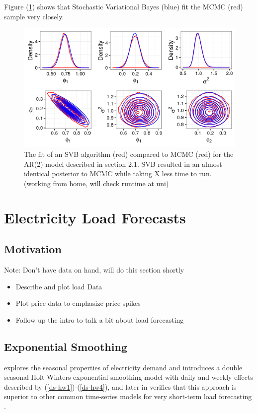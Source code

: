 \documentclass[12pt,a4paper]{article}%
\numberwithin{equation}{section}
\begin{document}
Figure (\ref{VBfit}) shows that Stochastic Variational Bayes (blue) fit the MCMC (red) sample very closely.

\begin{figure}[h]
\label{VBfit}
\centering
\includegraphics[scale = 0.5]{VBfit.png}
\caption{The fit of an SVB algorithm (red) compared to MCMC (red) for the AR(2) model described in section 2.1. SVB resulted in an almost identical posterior to MCMC while taking X less time to run. (working from home, will check runtime at uni)}
\end{figure}

\section{Electricity Load Forecasts}
\subsection{Motivation}

Note: Don't have data on hand, will do this section shortly

\begin{itemize}
\item Describe and plot load Data
\item Plot price data to emphasize price spikes
\item Follow up the intro to talk a bit about load forecasting
\end{itemize}

\subsection{Exponential Smoothing}

\citet{Taylor2003} explores the seasonal properties of electricity demand and introduces a double seasonal Holt-Winters exponential smoothing model with daily and weekly effects described by (\ref{ds-hw1})-(\ref{ds-hw4}), and later in \citet{Taylor2008} verifies that this approach is superior to other common time-series models for very short-term load forecasting \citep{Taylor2008}.
\end{document}
